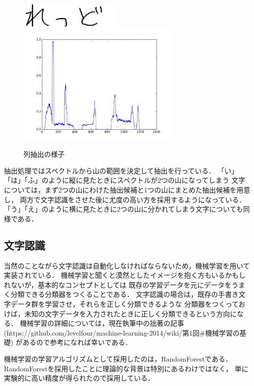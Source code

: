 \documentclass[11pt, a4paper]{jsarticle}
\begin{document}
\begin{center}
	\begin{figure}[htbp]
		\includegraphics[width=5cm]{img/red.png}
		\includegraphics[width=8cm]{img/row.png}
		\caption{列抽出の様子}\label{fig2}
	\end{figure}
\end{center}

抽出処理ではスペクトルから山の範囲を決定して抽出を行っている．
「い」「は」「ふ」のように縦に見たときにスペクトルが2つの山になってしまう
文字については，まず2つの山にわけた抽出候補と1つの山にまとめた抽出候補を用意し，
両方で文字認識をさせた後に尤度の高い方を採用するようになっている．
「う」「え」のように横に見たときに2つの山に分かれてしまう文字についても同様である．

\subsection{文字認識}
当然のことながら文字認識は自動化しなければならないため，機械学習を用いて実装されている．
機械学習と聞くと漠然としたイメージを抱く方もいるかもしれないが，基本的なコンセプトとしては
既存の学習データを元にデータをうまく分類できる分類器をつくることである．
文字認識の場合は，既存の手書き文字データ群を学習させ，それらを正しく分類できるような
分類器をつくっておけば，未知の文字データを入力されたときに正しく分類できるという方向になる．
機械学習の詳細については，現在執筆中の拙著の記事
(https://github.com/levelfour/machine-learning-2014/wiki/第1回\#機械学習の基礎)
があるので参考になれば幸いである．

機械学習の学習アルゴリズムとして採用したのは，RandomForestである．
RandomForestを採用したことに理論的な背景は特別にあるわけではなく，
単に実験的に高い精度が得られたので採用している．
\end{document}
